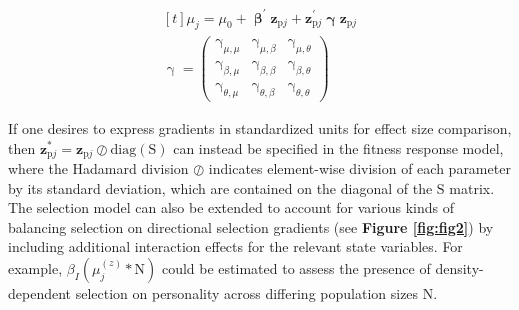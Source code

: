\documentclass{article}
\begin{document}
\begin{equation} \tag{1.3}\label{eq:1.3}
\begin{gathered}[t]
\mu_{j} = \mu_0 + \boldsymbol{\upbeta}^{{\prime}}\boldsymbol{z}_{\boldsymbol{\mathrm{p}}j} + \boldsymbol{z}^{\prime}_{\boldsymbol{\mathrm{p}}j} \boldsymbol{\upgamma} \boldsymbol{z}_{\boldsymbol{\mathrm{p}}j} \\
\boldsymbol{\mathrm{\upgamma}} =
\begin{pmatrix}
\upgamma _{\mu,\mu} & 
\upgamma _{\mu,\beta} &
\upgamma _{\mu,\theta} \\
\upgamma _{\beta,\mu} & \upgamma _{\beta,\beta} & \upgamma _{\beta,\theta} \\
\upgamma _{\theta,\mu} & \upgamma _{\theta,\beta} & \upgamma _{\theta,\theta} 
\end{pmatrix} \nonumber
\end{gathered}
\end{equation}

If one desires to express gradients in standardized units for effect
size comparison, then
\(\boldsymbol{z}^*_{\boldsymbol{\mathrm{p}}j}=\boldsymbol{z}_{\boldsymbol{\mathrm{p}}j}\oslash \mathrm{diag}(\boldsymbol{\mathrm{S}})\)
can instead be specified in the fitness response model, where the
Hadamard division \(\oslash\) indicates element-wise division of each
parameter by its standard deviation, which are contained on the diagonal
of the \(\boldsymbol{\mathrm{S}}\) matrix. The selection model can also
be extended to account for various kinds of balancing selection on
directional selection gradients (see \textbf{Figure \ref{fig:fig2}}) by
including additional interaction effects for the relevant state
variables. For example, \(\beta_{I} ( \mu^{(z)}_{j} * \mathrm{N} )\)
could be estimated to assess the presence of density-dependent selection
on personality across differing population sizes \(\mathrm{N}\).
\end{document}
